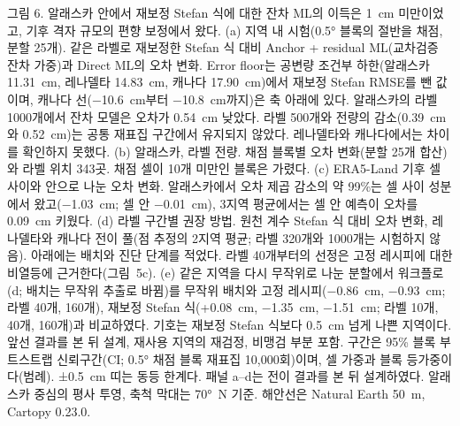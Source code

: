 \noindent 그림 6. 알래스카 안에서 재보정 Stefan 식에 대한 잔차 ML의 이득은 1~cm 미만이었고, 기후 격자 규모의 편향 보정에서 왔다.
(a) 지역 내 시험(0.5° 블록의 절반을 채점, 분할 25개). 같은 라벨로 재보정한 Stefan 식 대비 Anchor + residual ML(교차검증 잔차 가중)과 Direct ML의 오차 변화.
Error floor는 공변량 조건부 하한(알래스카 11.31~cm, 레나델타 14.83~cm, 캐나다 17.90~cm)에서 재보정 Stefan RMSE를 뺀 값이며, 캐나다 선(−10.6~cm부터 −10.8~cm까지)은 축 아래에 있다.
알래스카의 라벨 1000개에서 잔차 모델은 오차가 0.54~cm 낮았다. 라벨 500개와 전량의 감소(0.39~cm와 0.52~cm)는 공통 재표집 구간에서 유지되지 않았다.
레나델타와 캐나다에서는 차이를 확인하지 못했다.
(b) 알래스카, 라벨 전량. 채점 블록별 오차 변화(분할 25개 합산)와 라벨 위치 343곳. 채점 셀이 10개 미만인 블록은 가렸다.
(c) ERA5-Land 기후 셀 사이와 안으로 나눈 오차 변화.
알래스카에서 오차 제곱 감소의 약 99\%는 셀 사이 성분에서 왔고(−1.03~cm; 셀 안 −0.01~cm), 3지역 평균에서는 셀 안 예측이 오차를 0.09~cm 키웠다.
(d) 라벨 구간별 권장 방법. 원천 계수 Stefan 식 대비 오차 변화, 레나델타와 캐나다 전이 풀(점 추정의 2지역 평균; 라벨 320개와 1000개는 시험하지 않음). 아래에는 배치와 진단 단계를 적었다. 라벨 40개부터의 선정은 고정 레시피에 대한 비열등에 근거한다(그림~5c).
(e) 같은 지역을 다시 무작위로 나눈 분할에서 워크플로(d; 배치는 무작위 추출로 바뀜)를 무작위 배치와 고정 레시피(−0.86~cm, −0.93~cm; 라벨 40개, 160개), 재보정 Stefan 식(+0.08~cm, −1.35~cm, −1.51~cm; 라벨 10개, 40개, 160개)과 비교하였다. 기호는 재보정 Stefan 식보다 0.5~cm 넘게 나쁜 지역이다. 앞선 결과를 본 뒤 설계, 재사용 지역의 재검정, 비맹검 부분 포함.
구간은 95\% 블록 부트스트랩 신뢰구간(CI; 0.5° 채점 블록 재표집 10,000회)이며, 셀 가중과 블록 등가중이다(범례). ±0.5~cm 띠는 동등 한계다.
패널 a--d는 전이 결과를 본 뒤 설계하였다.
알래스카 중심의 평사 투영, 축척 막대는 70°~N 기준. 해안선은 Natural Earth 50~m, Cartopy 0.23.0.

